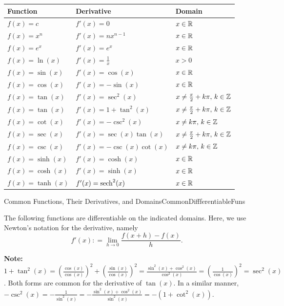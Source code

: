 \bigskip


\bigskip


\newsavebox{\mybox}

\sbox{\mybox}
{
\renewcommand{\arraystretch}{1.5}
\begin{tabular}{|>{\bfseries\boldmath}l|>{\bfseries\boldmath}l|>{\bfseries\boldmath}l|}
\hline
Function & Derivative & Domain \\
\hline
$f(x) = c$ & $f'(x) = 0$ & $x \in \mathbb R$ \\
$f(x) = x^n$ & $f'(x) = nx^{n-1}$ & $x \in \mathbb R$ \\
$f(x) = e^x$ & $f'(x) = e^x$ & $x \in \mathbb R$ \\
$f(x) = \ln(x)$ & $f'(x) = \frac{1}{x}$ & $x > 0$ \\
$f(x) = \sin(x)$ & $f'(x) = \cos(x)$ & $x \in \mathbb R$ \\
$f(x) = \cos(x)$ & $f'(x) = -\sin(x)$ & $x \in \mathbb R$ \\
$f(x) = \tan(x)$ & $f'(x) = \sec^2(x)$ & $x \neq \frac{\pi}{2} + k\pi, \, k \in \mathbb Z$ \\
$f(x) = \tan(x)$ & $f'(x) = 1 + \tan^2(x)$ & $x \neq \frac{\pi}{2} + k\pi, \, k \in \mathbb Z$ \\
$f(x) = \cot(x)$ & $f'(x) = -\csc^2(x)$ & $x \neq k\pi, \, k \in \mathbb Z$ \\
$f(x) = \sec(x)$ & $f'(x) = \sec(x)\tan(x)$ & $x \neq \frac{\pi}{2} + k\pi, \, k \in \mathbb Z$ \\
$f(x) = \csc(x)$ & $f'(x) = -\csc(x)\cot(x)$ & $x \neq k\pi, \, k \in \mathbb Z$ \\
$f(x) = \sinh(x)$ & $f'(x) = \cosh(x)$ & $x \in \mathbb R$ \\
$f(x) = \cosh(x)$ & $f'(x) = \sinh(x)$ & $x \in \mathbb R$ \\
$f(x) = \tanh(x)$ & $f'(x) = {\rm sech}^2(x)$ & $x \in \mathbb R$ \\
\hline
\end{tabular}
}

\begin{propColor}{Common Functions, Their Derivatives, and Domains}{CommonDiffferentiableFuns}

The following functions are differentiable on the indicated domains. Here, we use Newton's notation for the derivative, namely
$$
    f'(x) : = \lim_{h \to 0} \frac{f(x + h) - f(x)}{h}.
$$

\vspace*{.3cm}
\begin{center}
\usebox{\mybox}
\end{center}
\bigskip

\textbf{Note:} $1 + \tan^2(x)= \left( \frac{\cos(x)}{\cos(x)}\right)^2  + \left( \frac{\sin(x)}{\cos(x)}\right)^2 =  \frac{\sin^2(x) + \cos^2(x)}{\cos^2(x)}   = \left( \frac{1}{\cos(x)}\right)^2  = \sec^2(x) $. Both forms are common for the derivative of $\tan(x)$. In a similar manner, $-\csc^2(x) = -\frac{1}{\sin^2(x)} = - \frac{\sin^2(x) + \cos^2(x)}{\sin^2(x)} = - \left(1 + \cot^2(x)\right)$.

\end{propColor}

